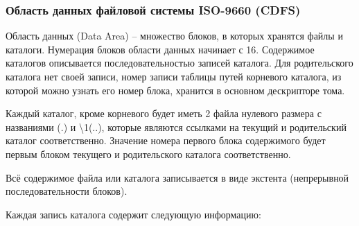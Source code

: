 \subsubsection{Область данных файловой системы ISO-9660 (CDFS)}

Область данных (Data Area) -- множество блоков, в которых хранятся файлы и каталоги. Нумерация блоков области данных начинает с 16. Содержимое каталогов описывается последовательностью записей каталога. Для родительского каталога нет своей записи, номер записи таблицы путей корневого каталога, из которой можно узнать его номер блока, хранится в основном дескрипторе тома.

Каждый каталог, кроме корневого будет иметь 2 файла нулевого размера с названиями \textquotedbl\textquotedbl (\textquotedbl.\textquotedbl) и \textquotedbl\textbackslash1\textquotedbl (\textquotedbl..\textquotedbl), которые являются ссылками на текущий и родительский каталог соответственно. Значение номера первого блока содержимого будет первым блоком текущего и родительского каталога соответственно.

Всё содержимое файла или каталога записывается в виде экстента (непрерывной последовательности блоков).

Каждая запись каталога содержит следующую информацию:

